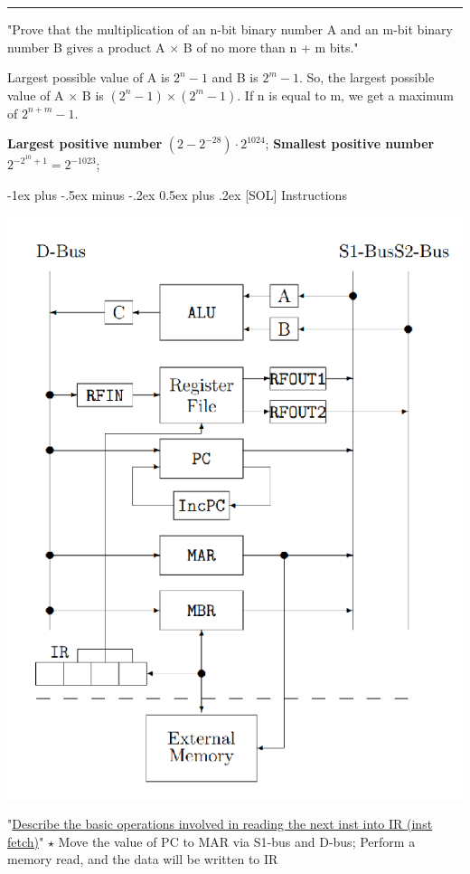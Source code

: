 \documentclass[a4paper]{article}
\makeatletter
\renewcommand{\section}{\@startsection{section}{1}{0mm}%
                                {-1ex plus -.5ex minus -.2ex}%
                                {0.5ex plus .2ex}%
                                {\normalfont\normalsize\bfseries}}
\makeatother
\begin{document}
\begin{multicols*}{2}
  \rule{1\linewidth}{0.4pt}

  "Prove that the multiplication of an n-bit binary number A and an m-bit binary number B gives a product A $\times$ B of no more than n + m bits."

  Largest possible value of A is $2^n - 1$ and B is $2^m - 1$. So, the largest possible value of A $\times$ B is $(2^n - 1) \times (2^m - 1)$. If n is equal to m, we get a maximum of $2^{n+m} - 1$.

  \textbf{Largest positive number} $(2-2^{-28}) \cdot 2^{1024}$; \textbf{Smallest positive number} $2^{-2^{10}+1} = 2^{-1023}$;

  \section{[SOL] Instructions}

  \begin{minipage}{0.2\textwidth}
    \includegraphics[width=\textwidth]{./ex-cpu.png}
  \end{minipage}
  \begin{minipage}{0.25\textwidth}
    "\ul{Describe the basic operations involved in reading the next inst into IR (inst fetch)}"
    $\star$ Move the value of PC to MAR via S1-bus and D-bus; Perform a memory read, and the data will be written to IR


\end{minipage}
\end{multicols*}
\end{document}
